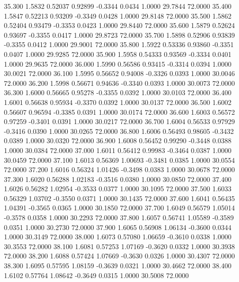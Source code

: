   35.300   1.5832   0.52037   0.92899  -0.3344   0.0434   1.0000  29.7844  72.0000
  35.400   1.5847   0.52213   0.93209  -0.3349   0.0428   1.0000  29.8148  72.0000
  35.500   1.5862   0.52404   0.93479  -0.3353   0.0423   1.0000  29.8440  72.0000
  35.600   1.5879   0.52624   0.93697  -0.3355   0.0417   1.0000  29.8723  72.0000
  35.700   1.5898   0.52906   0.93839  -0.3355   0.0412   1.0000  29.9001  72.0000
  35.800   1.5922   0.53336   0.93860  -0.3351   0.0407   1.0000  29.9285  72.0000
  35.900   1.5958   0.54333   0.93569  -0.3334   0.0401   1.0000  29.9635  72.0000
  36.000   1.5990   0.56586   0.93415  -0.3314   0.0394   1.0000  30.0021  72.0000
  36.100   1.5995   0.56652   0.94008  -0.3326   0.0393   1.0000  30.0046  72.0000
  36.200   1.5998   0.56671   0.94636  -0.3340   0.0393   1.0000  30.0073  72.0000
  36.300   1.6000   0.56665   0.95278  -0.3355   0.0392   1.0000  30.0103  72.0000
  36.400   1.6001   0.56638   0.95934  -0.3370   0.0392   1.0000  30.0137  72.0000
  36.500   1.6002   0.56607   0.96594  -0.3385   0.0391   1.0000  30.0174  72.0000
  36.600   1.6003   0.56572   0.97259  -0.3401   0.0391   1.0000  30.0217  72.0000
  36.700   1.6004   0.56533   0.97929  -0.3416   0.0390   1.0000  30.0265  72.0000
  36.800   1.6006   0.56493   0.98605  -0.3432   0.0389   1.0000  30.0320  72.0000
  36.900   1.6008   0.56452   0.99290  -0.3448   0.0388   1.0000  30.0384  72.0000
  37.000   1.6011   0.56412   0.99983  -0.3464   0.0387   1.0000  30.0459  72.0000
  37.100   1.6013   0.56369   1.00693  -0.3481   0.0385   1.0000  30.0554  72.0000
  37.200   1.6016   0.56324   1.01426  -0.3498   0.0383   1.0000  30.0678  72.0000
  37.300   1.6020   0.56288   1.02183  -0.3516   0.0380   1.0000  30.0850  72.0000
  37.400   1.6026   0.56282   1.02954  -0.3533   0.0377   1.0000  30.1095  72.0000
  37.500   1.6033   0.56329   1.03702  -0.3550   0.0371   1.0000  30.1435  72.0000
  37.600   1.6041   0.56435   1.04391  -0.3565   0.0365   1.0000  30.1850  72.0000
  37.700   1.6049   0.56579   1.05014  -0.3578   0.0358   1.0000  30.2293  72.0000
  37.800   1.6057   0.56741   1.05589  -0.3589   0.0351   1.0000  30.2730  72.0000
  37.900   1.6065   0.56908   1.06134  -0.3600   0.0344   1.0000  30.3149  72.0000
  38.000   1.6073   0.57080   1.06659  -0.3610   0.0338   1.0000  30.3553  72.0000
  38.100   1.6081   0.57253   1.07169  -0.3620   0.0332   1.0000  30.3938  72.0000
  38.200   1.6088   0.57424   1.07669  -0.3630   0.0326   1.0000  30.4307  72.0000
  38.300   1.6095   0.57595   1.08159  -0.3639   0.0321   1.0000  30.4662  72.0000
  38.400   1.6102   0.57764   1.08642  -0.3649   0.0315   1.0000  30.5008  72.0000
